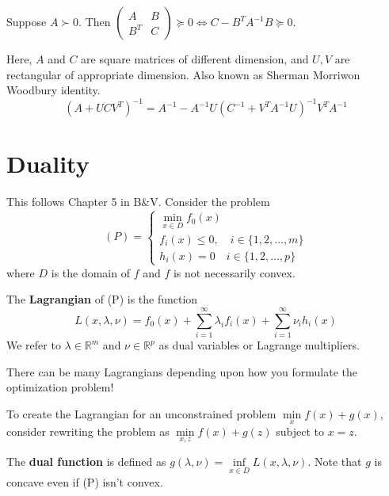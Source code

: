 \documentclass[english, 11pt]{article}
\begin{document}
\begin{thrm}
Suppose $A \succ 0$. Then $\begin{pmatrix} A & B \\ B^T & C \end{pmatrix} \succeq 0 \iff C - B^T A^{-1} B \succeq 0$.
\end{thrm}

\begin{thrm}
Here, $A$ and $C$ are square matrices of different dimension, and $U,V$ are rectangular of appropriate dimension. Also known as Sherman Morriwon Woodbury identity.
\[
(A + U C V^T)^{-1} = A^{-1} - A^{-1} U ( C^{-1} + V^T A^{-1} U)^{-1} V^T A^{-1}
\]
\end{thrm}



\section{Duality}
This follows Chapter 5 in B\&V.
Consider the problem 
\[
(P) = \begin{cases} \min \limits_{x \in D} f_0(x)  \\
f_i(x) \le 0, \quad i \in \{1,2,\dots,m\} \\
h_i(x) =0 \quad i \in \{1,2,\dots,p\}
\end{cases}
\]
where $D$ is the domain of $f$ and $f$ is not necessarily convex.

\begin{defn}[Lagrangian]
The {\bf Lagrangian} of (P) is the function
\[
L(x,\lambda,\nu) = f_0(x) + \sum_{i=1}^\infty \lambda_i f_i(x) + \sum_{i=1}^\infty \nu_i h_i(x)
\]
We refer to $\lambda \in \mathbb{R}^m$ and $\nu \in \mathbb{R}^p$ as dual variables or Lagrange multipliers.
\end{defn}


\begin{rem}
 There can be many Lagrangians depending upon how you formulate the optimization problem!
 \end{rem}
 
 \begin{rem}
 To create the Lagrangian for an unconstrained problem $\min \limits_x f(x) + g(x)$, consider rewriting the problem as $\min \limits_{x,z} f(x) + g(z)$ subject to $x=z$.
 \end{rem}
 
 \begin{defn}
 The {\bf dual function} is defined as $g(\lambda,\nu) = \inf \limits_{x \in D} L(x,\lambda,\nu)$. Note that $g$ is concave even if (P) isn't convex.
 \end{defn}
 
\end{document}
